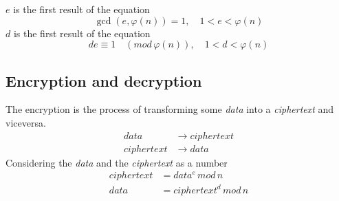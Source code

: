 \documentclass{article}
\begin{document}
\(e\) is the first result of the equation
\[
	\gcd(e, \varphi(n))=1,
	\quad	1<e<\varphi(n)
\]
\(d\) is the first result of the equation
\[
	de\equiv 1\quad (mod\,\varphi(n)),\quad 1<d<\varphi(n)
\]

\subsection{Encryption and decryption}

The encryption is the process of transforming some \textit{data} into a \textit{ciphertext} and viceversa.
\begin{align*}
	data&\to ciphertext\\
	ciphertext&\to data
\end{align*}
Considering the \textit{data} and the \textit{ciphertext} as a number
\begin{align*}
	ciphertext&=data^e\,mod\,n\\
	data&=ciphertext^d\,mod\,n
\end{align*}
\end{document}
